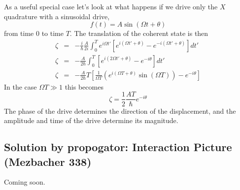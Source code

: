 As a useful special case let's look at what happens if we drive only the $X$ quadrature with a sinusoidal drive, \begin{equation}
f(t)=A\sin\left(\Omega t+\theta\right) \end{equation}
from time $0$ to time $T$. The translation of the coherent state is then\begin{eqnarray*}
\zeta & = & -\frac{i}{\hbar}\frac{A}{2i}\int_{0}^{T}e^{i\Omega t'}\left[e^{i(\Omega t'+\theta)}-e^{-i(\Omega t'+\theta)}\right]dt'\\
\zeta & = & -\frac{A}{2\hbar}\int_{0}^{T}\left[e^{i(2\Omega t'+\theta)}-e^{-i\theta}\right]dt'\\
\zeta & = & -\frac{A}{2\hbar}T\left[\frac{1}{\Omega T}\left(e^{i(\Omega T+\theta)}\sin\left(\Omega T\right)\right)-e^{-i\theta}\right]\end{eqnarray*}
In the case $\Omega T\gg1$ this becomes \begin{equation}
\zeta=\frac{1}{2}\frac{AT}{\hbar}e^{-i\theta} \end{equation}
The phase of the drive determines the direction of the displacement, and the amplitude and time of the drive determine its magnitude.


\subsection{Solution by propogator: Interaction Picture (Mezbacher 338)}

Coming soon.
